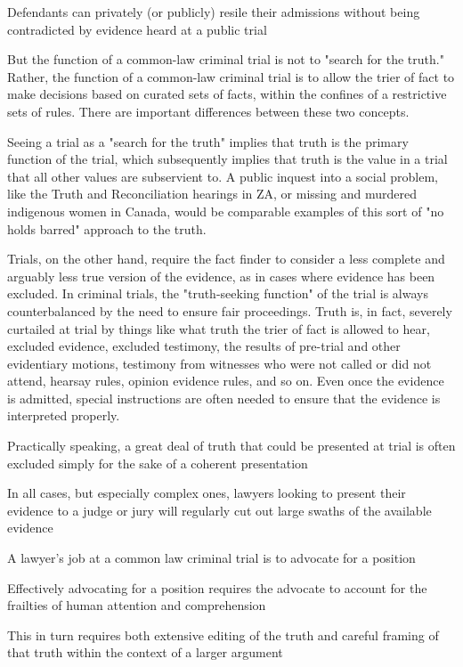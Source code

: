 Defendants can privately (or publicly) resile their admissions without being contradicted by evidence heard at a public trial

But the function of a common-law criminal trial is not to "search for the truth." Rather, the function of a common-law criminal trial is to allow the trier of fact to make decisions based on curated sets of facts, within the confines of a restrictive sets of rules. There are important differences between these two concepts. 

Seeing a trial as a "search for the truth" implies that truth is the primary function of the trial, which subsequently implies that truth is the value in a trial that all other values are subservient to. A public inquest into a social problem, like the Truth and Reconciliation hearings in ZA, or missing and murdered indigenous women in Canada, would be comparable examples of this sort of "no holds barred" approach to the truth. 

Trials, on the other hand, require the fact finder to consider a less complete and arguably less true version of the evidence, as in cases where evidence has been excluded. In criminal trials, the "truth-seeking function" of the trial is always counterbalanced by the need to ensure fair proceedings. Truth is, in fact, severely curtailed at trial by things like what truth the trier of fact is allowed to hear, excluded evidence, excluded testimony, the results of pre-trial and other evidentiary motions, testimony from witnesses who were not called or did not attend, hearsay rules, opinion evidence rules, and so on. Even once the evidence is admitted, special instructions are often needed to ensure that the evidence is interpreted properly. 

Practically speaking, a great deal of truth that could be presented at trial is often excluded simply for the sake of a coherent presentation

In all cases, but especially complex ones, lawyers looking to present their evidence to a judge or jury will regularly cut out large swaths of the available evidence

A lawyer's job at a common law criminal trial is to advocate for a position

Effectively advocating for a position requires the advocate to account for the frailties of human attention and comprehension

This in turn requires both extensive editing of the truth and careful framing of that truth within the context of a larger argument

